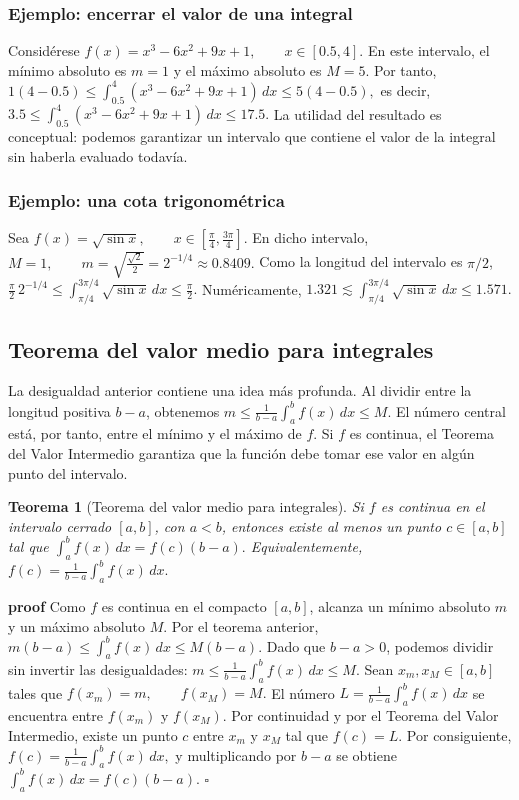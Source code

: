 \documentclass[12pt]{article}
\newtheorem{Teo}{Teorema}
\begin{document}
\subsubsection*{Ejemplo: encerrar el valor de una integral}
Considérese
$
f(x)=x^3-6x^2+9x+1,
\qquad x\in[0.5,4].
$
En este intervalo, el mínimo absoluto es $m=1$ y el máximo absoluto es $M=5$.
Por tanto,
$
1(4-0.5)
\le
\int_{0.5}^{4}(x^3-6x^2+9x+1)\,dx
\le
5(4-0.5),
$
es decir,
$
\boxed{
3.5\le
\int_{0.5}^{4}(x^3-6x^2+9x+1)\,dx
\le17.5.
}
$
La utilidad del resultado es conceptual: podemos garantizar un intervalo que
contiene el valor de la integral sin haberla evaluado todavía.
\subsubsection*{Ejemplo: una cota trigonométrica}
Sea
$
f(x)=\sqrt{\sin x},
\qquad x\in\left[\frac{\pi}{4},\frac{3\pi}{4}\right].
$
En dicho intervalo,
$
M=1,
\qquad
m=\sqrt{\frac{\sqrt2}{2}}=2^{-1/4}\approx0.8409.
$
Como la longitud del intervalo es $\pi/2$,
$
\frac{\pi}{2}\,2^{-1/4}
\le
\int_{\pi/4}^{3\pi/4}\sqrt{\sin x}\,dx
\le
\frac{\pi}{2}.
$
Numéricamente,
$
1.321\lesssim
\int_{\pi/4}^{3\pi/4}\sqrt{\sin x}\,dx
\le1.571.
$
\subsection*{Teorema del valor medio para integrales}
La desigualdad anterior contiene una idea más profunda. Al dividir entre la
longitud positiva $b-a$, obtenemos
$
m\le
\frac{1}{b-a}\int_a^b f(x)\,dx
\le M.
$
El número central está, por tanto, entre el mínimo y el máximo de $f$. Si $f$
es continua, el Teorema del Valor Intermedio garantiza que la función debe
tomar ese valor en algún punto del intervalo.

\begin{Teo}[Teorema del valor medio para integrales]
Si $f$ es continua en el intervalo cerrado $[a,b]$, con $a<b$, entonces existe
al menos un punto $c\in[a,b]$ tal que
$
\boxed{
\int_a^b f(x)\,dx=f(c)(b-a).
}
$
Equivalentemente,
$
\boxed{
f(c)=\frac{1}{b-a}\int_a^b f(x)\,dx.}
$
\end{Teo}

\textbf{proof}
Como $f$ es continua en el compacto $[a,b]$, alcanza un mínimo absoluto $m$ y
un máximo absoluto $M$. Por el teorema anterior,
$
m(b-a)\le\int_a^b f(x)\,dx\le M(b-a).
$
Dado que $b-a>0$, podemos dividir sin invertir las desigualdades:
$
m\le\frac{1}{b-a}\int_a^b f(x)\,dx\le M.
$
Sean $x_m,x_M\in[a,b]$ tales que
$
f(x_m)=m,
\qquad
f(x_M)=M.
$
El número
$
L=\frac{1}{b-a}\int_a^b f(x)\,dx
$
se encuentra entre $f(x_m)$ y $f(x_M)$. Por continuidad y por el Teorema del
Valor Intermedio, existe un punto $c$ entre $x_m$ y $x_M$ tal que
$
f(c)=L.
$
Por consiguiente,
$
f(c)=\frac{1}{b-a}\int_a^b f(x)\,dx,
$
y multiplicando por $b-a$ se obtiene
$
\int_a^b f(x)\,dx=f(c)(b-a).
$
\hfill$\square$
\end{document}
